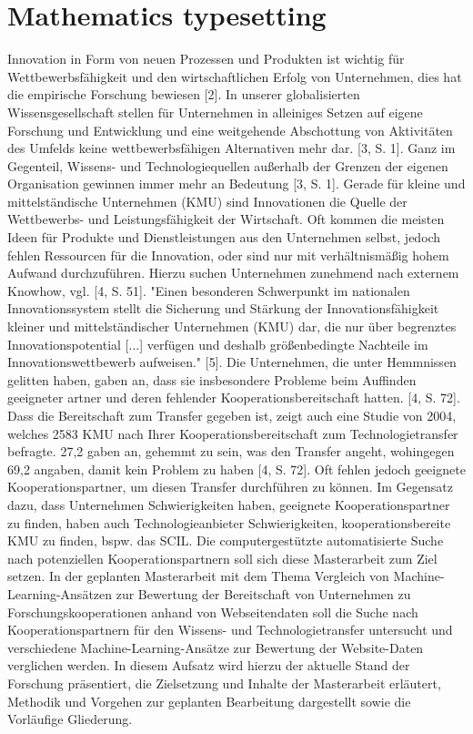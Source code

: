 \documentclass[11pt,letterpaper]{article}
\begin{document}
\section{Mathematics typesetting}
Innovation in Form von neuen Prozessen und Produkten ist wichtig für Wettbewerbsfähigkeit und den wirtschaftlichen Erfolg von Unternehmen,
 dies hat die empirische Forschung bewiesen [2]. In unserer globalisierten Wissensgesellschaft 
 stellen für Unternehmen in alleiniges Setzen auf eigene Forschung und Entwicklung und eine weitgehende
  Abschottung von Aktivitäten des Umfelds keine wettbewerbsfähigen Alternativen mehr dar. [3, S. 1]. 
  Ganz im Gegenteil, Wissens- und Technologiequellen außerhalb der Grenzen der eigenen Organisation gewinnen
   immer mehr an Bedeutung [3, S. 1]. Gerade für kleine und mittelständische Unternehmen (KMU) sind 
   Innovationen die Quelle der Wettbewerbs- und Leistungsfähigkeit der Wirtschaft. Oft kommen die meisten
    Ideen für Produkte und Dienstleistungen aus den Unternehmen selbst, jedoch fehlen Ressourcen für die 
    Innovation, oder sind nur mit verhältnismäßig hohem Aufwand durchzuführen. Hierzu suchen Unternehmen
     zunehmend nach externem Knowhow, vgl. [4, S. 51]. "Einen besonderen Schwerpunkt im nationalen 
     Innovationssystem stellt die Sicherung und Stärkung der Innovationsfähigkeit kleiner und mittelständischer 
     Unternehmen (KMU) dar, die nur über begrenztes Innovationspotential [...] verfügen und deshalb größenbedingte Nachteile im Innovationswettbewerb aufweisen." [5]. 
     Die Unternehmen, die unter Hemmnissen gelitten haben, gaben an, dass sie insbesondere Probleme beim Auffinden geeigneter 
     artner und deren fehlender Kooperationsbereitschaft hatten. [4, S. 72]. Dass die Bereitschaft zum Transfer gegeben ist, zeigt
      auch eine Studie von 2004, welches 2583 KMU nach Ihrer Kooperationsbereitschaft zum Technologietransfer befragte. 27,2 gaben an, gehemmt zu sein, 
      was den Transfer angeht, wohingegen 69,2 angaben, damit kein Problem zu haben [4, S. 72]. 
      Oft fehlen jedoch geeignete Kooperationspartner, um diesen Transfer durchführen zu können. 
Im Gegensatz dazu, dass Unternehmen Schwierigkeiten haben, geeignete Kooperationspartner zu finden, 
haben auch Technologieanbieter Schwierigkeiten, kooperationsbereite KMU zu finden, bspw. das SCIL.
Die computergestützte automatisierte Suche nach potenziellen Kooperationspartnern soll sich diese 
Masterarbeit zum Ziel setzen.
In der geplanten Masterarbeit mit dem Thema Vergleich von Machine-Learning-Ansätzen zur Bewertung
 der Bereitschaft von Unternehmen zu Forschungskooperationen anhand von Webseitendaten soll die 
 Suche nach Kooperationspartnern für den Wissens- und Technologietransfer untersucht und verschiedene
  Machine-Learning-Ansätze zur Bewertung der Website-Daten verglichen werden. 
In diesem Aufsatz wird hierzu der aktuelle Stand der Forschung präsentiert, die Zielsetzung und
 Inhalte der Masterarbeit erläutert, Methodik und Vorgehen zur geplanten Bearbeitung dargestellt 
 sowie die Vorläufige Gliederung.
\end{document}
